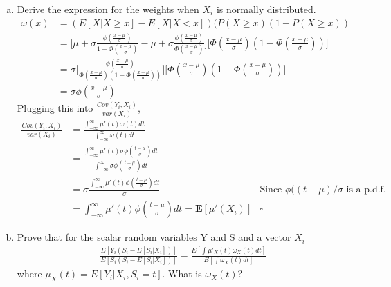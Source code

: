 \documentclass[11pt]{article}
\begin{document}
\begin{enumerate}[a)]
	\item Derive the expression for the weights when $X_i$ is normally distributed.
	\begin{align*}
		\omega(x) &= ( E[X | X \geq x] - E[X | X < x] ) (P(X \geq x) ( 1 - P(X \geq x)) \\
		&=\bigg[ \mu + \sigma \frac{\phi (\frac{x - \mu}{\sigma})}{1 - \Phi( \frac{x - \mu}{\sigma})} - \mu + \sigma \frac{\phi (\frac{x - \mu}{\sigma})}{\Phi( \frac{x - \mu}{\sigma})} \bigg] \bigg[\Phi( \frac{x - \mu}{\sigma})(1- \Phi( \frac{x - \mu}{\sigma})) \bigg] \\
		&=\sigma \bigg[\frac{ \phi( \frac{x - \mu}{\sigma}) }{\Phi( \frac{x - \mu}{\sigma})(1- \Phi( \frac{x - \mu}{\sigma}))} \bigg] \bigg[\Phi( \frac{x - \mu}{\sigma})(1- \Phi( \frac{x - \mu}{\sigma}))\bigg] \\
		&=\sigma \phi( \frac{x - \mu}{\sigma})
	\end{align*}
	Plugging this into $\frac{Cov(Y_i, X_i)}{var(X_i)}$,
	\begin{align*}
		\frac{Cov(Y_i, X_i)}{var(X_i)} &= \frac{\int_{-\infty}^{\infty} \mu'(t) \omega(t) dt}{\int_{-\infty}^{\infty} \omega(t) dt} \\
		&= \frac{\int_{-\infty}^{\infty} \mu'(t) \sigma \phi( \frac{t - \mu}{\sigma}) dt}{\int_{-\infty}^{\infty} \sigma \phi( \frac{t - \mu}{\sigma}) dt} \\
		&= \sigma \frac{\int_{-\infty}^{\infty} \mu'(t) \phi( \frac{t - \mu}{\sigma}) dt}{\sigma} &\mbox{Since $\phi((t-\mu)/\sigma$ is a p.d.f.} \\
		&= \int_{-\infty}^{\infty} \mu'(t) \phi( \frac{t - \mu}{\sigma}) dt = \mathbf{E}[\mu'(X_i)] &\square
	\end{align*}

	\item Prove that for the scalar random variables Y and S and a vector $X_i$ \\
	\begin{align*}
		\frac{E[Y_i(S_i - E[S_i|X_i])]}{E[S_i(S_i - E[S_i|X_i])]} = \frac{E [\int \mu'_X(t) 		\omega_X(t) dt]}{E[\int \omega_X(t) dt]}
		\end{align*}
	where $\mu_X(t) = E[Y_i|X_i, S_i=t]$. What is $\omega_X(t)$? \\


\end{enumerate}
\end{document}
